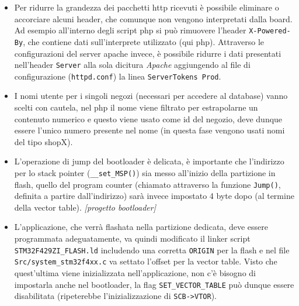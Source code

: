 \begin{itemize}
  \item Per ridurre la grandezza dei pacchetti http ricevuti \`e possibile eliminare o accorciare alcuni header, che comunque non vengono interpretati dalla board. Ad esempio all'interno degli script php si pu\`o rimuovere l'header \texttt{X-Powered-By}, che contiene dati sull'interprete utilizzato (qui php). Attraverso le configurazioni del server apache invece, \`e possibile ridurre i dati presentati nell'header \texttt{Server} alla sola dicitura \textit{Apache} aggiungendo al file di configurazione (\texttt{httpd.conf}) la linea \texttt{ServerTokens Prod}.
  \item I nomi utente per i singoli negozi (necessari per accedere al database) vanno scelti con cautela, nel php il nome viene filtrato per estrapolarne un contenuto numerico e questo viene usato come id del negozio, deve dunque essere l'unico numero presente nel nome (in questa fase vengono usati nomi del tipo shopX).
  \item L'operazione di jump del bootloader \`e delicata, \`e importante che l'indirizzo per lo stack pointer (\texttt{\_\_set\_MSP()}) sia messo all'inizio della partizione in flash, quello del program counter (chiamato attraverso la funzione \texttt{Jump()}, definita a partire dall'indirizzo) sar\`a invece impostato 4 byte dopo (al termine della vector table). \textit{[progetto bootloader]}
  \item L'applicazione, che verr\`a flashata nella partizione dedicata, deve essere programmata adeguatamente, va quindi modificato il linker script \texttt{STM32F429ZI\_FLASH.ld} includendo una corretta \texttt{ORIGIN} per la flash e nel file \texttt{Src/system\_stm32f4xx.c} va settato l'offset per la vector table. Visto che quest'ultima viene inizializzata nell'applicazione, non c'\`e bisogno di impostarla anche nel bootloader, la flag \texttt{SET\_VECTOR\_TABLE} pu\`o dunque essere disabilitata (ripeterebbe l'inizializzazione di \texttt{SCB->VTOR}).
\end{itemize}
